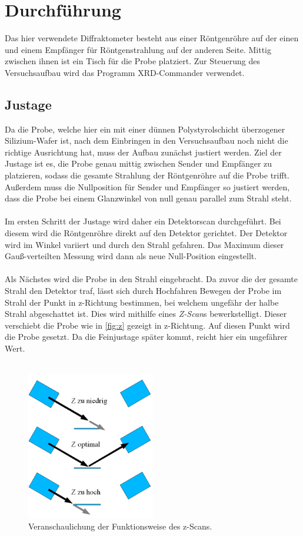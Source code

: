 \section{Durchführung}
\label{sec:Durchführung}
Das hier verwendete Diffraktometer besteht aus einer Röntgenröhre auf der einen und einem Empfänger für Röntgenstrahlung auf der anderen Seite. Mittig zwischen ihnen ist ein Tisch für die Probe platziert. Zur Steuerung des Versuchsaufbau wird das Programm XRD-Commander verwendet.

\subsection{Justage}
Da die Probe, welche hier ein mit einer dünnen Polystyrolschicht überzogener Silizium-Wafer ist, nach dem Einbringen in den Versuchsaufbau noch nicht die richtige Ausrichtung hat, muss der Aufbau zunächst justiert werden. Ziel der Justage ist es, die Probe genau mittig zwischen Sender und Empfänger zu platzieren, sodass die gesamte Strahlung der Röntgenröhre auf die Probe trifft. Außerdem muss die Nullposition für Sender und Empfänger so justiert werden, dass die Probe bei einem Glanzwinkel von null genau parallel zum Strahl steht.\\
\\
Im ersten Schritt der Justage wird daher ein Detektorscan durchgeführt. Bei diesem wird die Röntgenröhre direkt auf den Detektor gerichtet. Der Detektor wird im Winkel variiert und durch den Strahl gefahren. Das Maximum dieser Gauß-verteilten Messung wird dann als neue Null-Position eingestellt.\\
\\
Als Nächstes wird die Probe in den Strahl eingebracht. Da zuvor die der gesamte Strahl den Detektor traf, lässt sich durch Hochfahren Bewegen der Probe im Strahl der Punkt in z-Richtung bestimmen, bei welchem ungefähr der halbe Strahl abgeschattet ist. Dies wird mithilfe eines \textit{Z-Scan}s bewerkstelligt. Dieser verschiebt die Probe wie in \autoref{fig:z} gezeigt in z-Richtung. Auf diesen Punkt wird die Probe gesetzt. Da die Feinjustage später kommt, reicht hier ein ungefährer Wert.\\
\\
\begin{figure}
    \centering
    \includegraphics[width=0.5\textwidth]{figures/z.png}
    \caption{Veranschaulichung der Funktionsweise des z-Scans.}
    \label{fig:z}
\end{figure}
